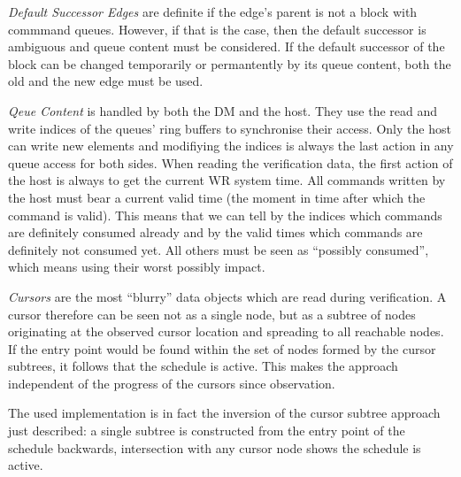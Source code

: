 \begin{itemize}
  \begin{item}
    \emph{Default Successor Edges} are definite if the edge's parent is not a block with commmand queues. However, if that is the case, then the default successor is ambiguous and queue content must be considered. If the default successor of the block can be changed temporarily or permantently by its queue content, both the old and the new edge must be used.
  \end{item}
  \begin{item}
    \emph{Qeue Content} is handled by both the DM and the host. They use the read and write indices of the queues' ring buffers to synchronise their access. Only the host can write new elements and modifiying the indices is always the last action in any queue access for both sides. When reading the verification data, the first action of the host is always to get the current WR system time. All commands written by the host must bear a current valid time (the moment in time after which the command is valid). This means that we can tell by the indices which commands are definitely consumed already and by the valid times which commands are definitely not consumed yet. All others must be seen as \enquote{possibly consumed}, which means using their worst possibly impact.
  \end{item}
  \begin{item}
    \emph{Cursors} are the most \enquote{blurry} data objects which are read during verification. A cursor therefore can be seen not as a single node, but as a subtree of nodes originating at the observed cursor location and spreading to all reachable nodes. If the entry point would be found within the set of nodes formed by the cursor subtrees, it follows that the schedule is active. This makes the approach independent of the progress of the cursors since observation.
    \par
    The used implementation is in fact the inversion of the cursor subtree approach just described: a single subtree is constructed from the entry point of the schedule backwards, intersection with any cursor node shows the schedule is active.
  \end{item}
\end{itemize}

